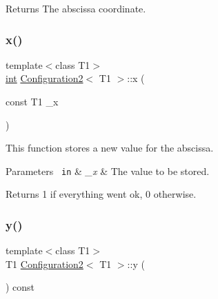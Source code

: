 \begin{DoxyReturn}{Returns}
The abscissa coordinate. 
\end{DoxyReturn}
\mbox{\label{class_configuration2_ac8b1ca22acbfd0c59d145eb3ac42f39d}} 
\subsubsection{\texorpdfstring{x()}{x()}\hspace{0.1cm}{\footnotesize\ttfamily [2/2]}}
{\footnotesize\ttfamily template$<$class T1$>$ \\
\mbox{\hyperlink{draw_8hh_aa620a13339ac3a1177c86edc549fda9b}{int}} \mbox{\hyperlink{class_configuration2}{Configuration2}}$<$ T1 $>$\+::x (\begin{DoxyParamCaption}\item[{const T1}]{\+\_\+x }\end{DoxyParamCaption})\hspace{0.3cm}{\ttfamily [inline]}}



This function stores a new value for the abscissa. 


\begin{DoxyParams}[1]{Parameters}
\mbox{\texttt{ in}}  & {\em \+\_\+x} & The value to be stored. \\
\hline
\end{DoxyParams}
\begin{DoxyReturn}{Returns}
1 if everything went ok, 0 otherwise. 
\end{DoxyReturn}
\mbox{\label{class_configuration2_a6f92f5478bb05304dae587203c8de9c1}} 
\subsubsection{\texorpdfstring{y()}{y()}\hspace{0.1cm}{\footnotesize\ttfamily [1/2]}}
{\footnotesize\ttfamily template$<$class T1$>$ \\
T1 \mbox{\hyperlink{class_configuration2}{Configuration2}}$<$ T1 $>$\+::y (\begin{DoxyParamCaption}{ }\end{DoxyParamCaption}) const\hspace{0.3cm}{\ttfamily [inline]}}

